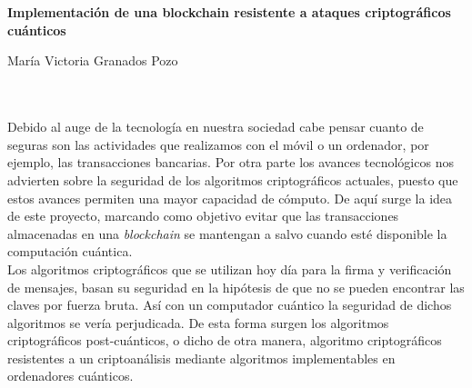 \chapter*{}






\cleardoublepage
\thispagestyle{empty}

\begin{center}
{\large\bfseries Implementación de una blockchain resistente a ataques criptográficos cuánticos}\\
\end{center}
\begin{center}
María Victoria Granados Pozo\\
\end{center}

\\

\vspace{0.7cm}
\\

Debido al auge de la tecnología en nuestra sociedad cabe pensar cuanto de seguras son las actividades que realizamos con el móvil o un ordenador, por ejemplo, las transacciones bancarias. Por otra parte los avances tecnológicos nos advierten sobre la seguridad de los algoritmos criptográficos actuales, puesto que estos avances permiten una mayor capacidad de cómputo. De aquí surge la idea de este proyecto, marcando como objetivo evitar que las transacciones almacenadas en una \textit{blockchain} se mantengan a salvo cuando esté disponible la computación cuántica.\\ 

Los algoritmos criptográficos que se utilizan hoy día para la firma y verificación de mensajes, basan su seguridad en la hipótesis de que no se pueden encontrar las claves por fuerza bruta. Así con un computador cuántico la seguridad de dichos algoritmos se vería perjudicada. De esta forma surgen los algoritmos criptográficos post-cuánticos, o dicho de otra manera, algoritmo criptográficos resistentes a un criptoanálisis mediante algoritmos implementables en ordenadores cuánticos.\\

